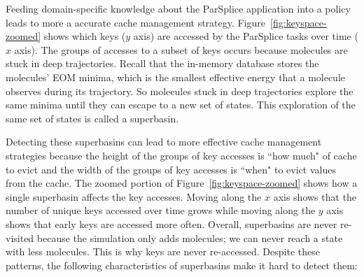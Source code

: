 %
%
%
%
%
%

Feeding domain-specific knowledge about the ParSplice application into a policy
leads to more a accurate cache management strategy.
Figure~\ref{fig:keyspace-zoomed} shows which keys (\(y\) axis) are accessed by
the ParSplice tasks over time (\(x\) axis). The groups of accesses to a subset
of keys occurs because molecules are stuck in deep trajectories. Recall that
the in-memory database stores the molecules' EOM minima, which is the smallest
effective energy that a molecule observes during its trajectory. So molecules
stuck in deep trajectories explore the same minima until they can escape to a
new set of states. This exploration of the same set of states is called a
superbasin. 

Detecting these superbasins can lead to more effective cache management
strategies because the height of the groups of key accesses is ``how much" of cache
to evict and the width of the groups of key accesses is ``when" to evict values from
the cache.  The zoomed portion of Figure~\ref{fig:keyspace-zoomed} shows how a
single superbasin affects the key accesses. Moving along the \(x\) axis shows
that the number of unique keys accessed over time grows while moving along the
\(y\) axis shows that early keys are accessed more often.  Overall, superbasins
are never re-visited because the simulation only adds molecules; we can never
reach a state with less molecules. This is why keys are never re-accessed.
Despite these patterns, the following characteristics of superbasins make it
hard to detect them:

